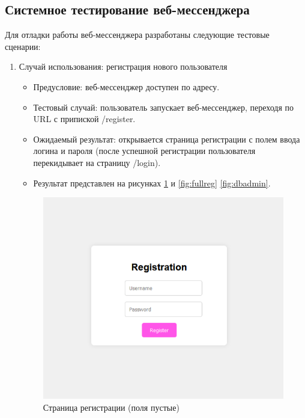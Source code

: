 \subsection{Системное тестирование веб-мессенджера}

Для отладки работы веб-мессенджера разработаны следующие тестовые сценарии:

\begin{enumerate}
		\item Случай использования: регистрация нового пользователя
	\begin{itemize}
		\item Предусловие: веб-мессенджер доступен по адресу.
		\item Тестовый случай: пользователь запускает веб-мессенджер, переходя по URL с припиской /register.
		\item Ожидаемый результат: открывается страница регистрации с полем ввода логина и пароля (после успешной регистрации пользователя перекидывает на страницу /login).
		\item Результат представлен на рисунках \ref{fig:clearreg} и \ref{fig:fullreg} \ref{fig:dbadmin}.
	\end{itemize}
	
	\begin{figure}[H]
		\centering
		\includegraphics[width=0.7\linewidth]{images/clear_reg}
		\caption{Страница регистрации (поля пустые)}
		\label{fig:clearreg}
	\end{figure}
		

\end{enumerate}
